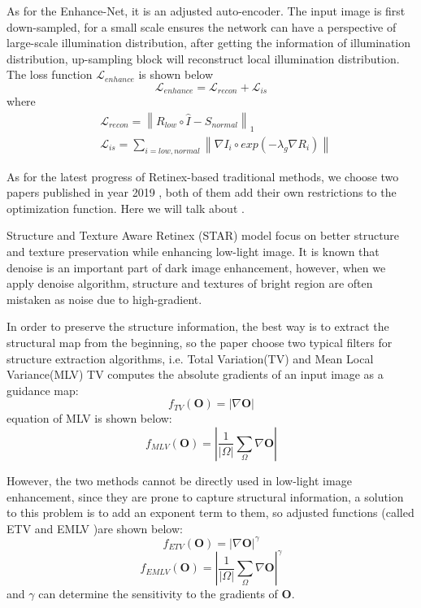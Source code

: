\documentclass[10pt,twocolumn,letterpaper]{article}
\begin{document}
As for the Enhance-Net, it is an adjusted auto-encoder. The input image is first down-sampled, for a small scale ensures the network can have a perspective of large-scale illumination distribution, after getting the information of illumination distribution, up-sampling block will reconstruct local illumination distribution. The loss function $\mathcal{L}_{enhance}$ is shown below
\begin{equation}
    \mathcal{L}_{enhance}=\mathcal{L}_{recon} + \mathcal{L}_{is}
\end{equation}
where
\begin{align}
    &\mathcal{L}_{recon} = \left\|R_{low} \circ \hat{I}- S_{normal}\right\|_1 \\
    &\mathcal{L}_{is}= \sum_{i=low,normal}\left\|\nabla I_i \circ exp(-\lambda_g\nabla R_i)\right\| 
\end{align}

As for the latest progress of Retinex-based traditional methods, we choose two papers published in year 2019 \cite{Xu2019STAR,kurihara2019low}, both of them add their own restrictions to the optimization function. Here we will talk about \cite{Xu2019STAR}.

Structure and Texture Aware Retinex (STAR) model \cite{Xu2019STAR} focus on better structure and texture preservation while enhancing low-light image. It is known that denoise is an important part of dark image enhancement, however, when we apply denoise algorithm, structure and textures of bright region are often mistaken as noise due to high-gradient.

In order to preserve the structure information, the best way is to extract the structural map from the beginning, so the paper choose two typical filters for structure extraction algorithms, i.e. Total Variation(TV) \cite{rudin1992nonlinear} and Mean Local Variance(MLV) \cite{cai2017joint}
TV computes the absolute gradients of an input image as a guidance map:
\begin{equation}
    f_{TV}(\mathbf{O}) = |\nabla \mathbf{O}|
\end{equation}
equation of MLV is shown below:
\begin{equation}
    f_{MLV}(\mathbf{O}) = |\frac{1}{|\Omega|}\sum_\Omega \nabla \mathbf{O}|
\end{equation}

However, the two methods cannot be directly used in low-light image enhancement, since they are prone to capture structural information, a solution to this problem is to add an exponent term to them, so adjusted functions (called ETV and EMLV )are shown below:
\begin{equation}
    f_{ETV}(\mathbf{O}) = |\nabla \mathbf{O}|^\gamma \label{con:etv}
\end{equation}
\begin{equation}
    f_{EMLV}(\mathbf{O}) = |\frac{1}{|\Omega|}\sum_\Omega \nabla \mathbf{O}|^\gamma \label{con:emlv}
\end{equation}
and $\gamma$ can determine the sensitivity to the gradients of $\mathbf{O}$.
\end{document}
